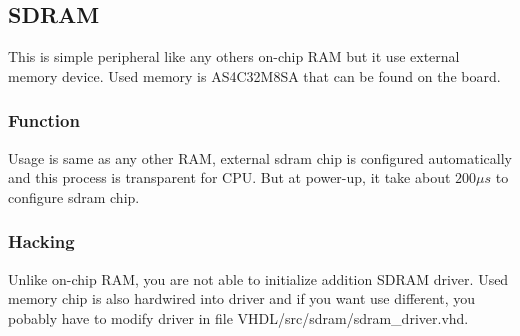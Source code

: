\subsection{SDRAM}

This is simple peripheral like any others on-chip RAM but it use 
external memory device. Used memory is AS4C32M8SA that can be found on 
the board.

\subsubsection{Function}

Usage is same as any other RAM, external sdram chip is configured 
automatically and this process is transparent for CPU. But at power-up, 
it take about $200 \mu s$ to configure sdram chip.

\subsubsection{Hacking}

Unlike on-chip RAM, you are not able to initialize addition SDRAM driver. 
Used memory chip is also hardwired into driver and if you want use 
different, you pobably have to modify driver in file
VHDL/src/sdram/sdram\_driver.vhd.
